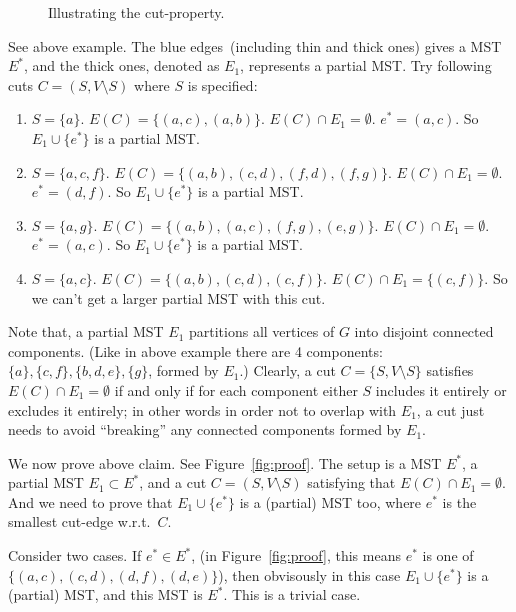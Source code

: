 \begin{figure}[h]
\centering{}
\caption{Illustrating the cut-property.}
\label{fig:spanning}
\end{figure}

See above example. The blue edges~(including thin and thick ones)
gives a MST $E^*$, and the thick ones, denoted as $E_1$, represents a partial MST.
Try following cuts $C = (S, V\setminus S)$ where $S$ is specified:
\begin{enumerate}
\item $S = \{a\}$. $E(C) = \{(a,c), (a,b)\}$. $E(C) \cap E_1 = \emptyset$. $e^* = (a,c)$.
So $E_1\cup\{e^*\}$ is a partial MST.
\item $S = \{a,c,f\}$. $E(C) = \{(a,b), (c,d), (f,d), (f,g)\}$. $E(C) \cap E_1 = \emptyset$. $e^* = (d,f)$.
So $E_1\cup\{e^*\}$ is a partial MST.
\item $S = \{a,g\}$. $E(C) = \{(a,b), (a,c), (f,g), (e,g)\}$. $E(C) \cap E_1 = \emptyset$. $e^* = (a,c)$.
So $E_1\cup\{e^*\}$ is a partial MST.
\item $S = \{a,c\}$. $E(C) = \{(a,b), (c,d), (c,f)\}$. $E(C) \cap E_1 = \{(c,f)\}$. So we can't get a larger partial MST with this cut.
\end{enumerate}

Note that, a partial MST $E_1$ partitions all vertices of $G$ into disjoint connected components.
(Like in above example there are 4 components: $\{a\}, \{c,f\}, \{b,d,e\}, \{g\}$, formed by $E_1$.)
Clearly, a cut $C=\{S,V\setminus S\}$ satisfies $E(C) \cap E_1 = \emptyset$ if and only if for each component
either $S$ includes it entirely or excludes it entirely;
in other words in order not to overlap with $E_1$, a cut just needs to avoid ``breaking''
any connected components formed by $E_1$.

We now prove above claim.  See Figure~\ref{fig:proof}.
The setup is a MST $E^*$, a partial MST $E_1\subset E^*$,
and a cut $C = (S,V\setminus S)$ satisfying that $E(C)\cap E_1 = \emptyset$.
And we need to prove that $E_1\cup \{e^*\}$ is a (partial) MST too,
where $e^*$ is the smallest cut-edge w.r.t.\ $C$.

Consider two cases. If $e^* \in E^*$,
(in Figure~\ref{fig:proof}, this means $e^*$ is one of $\{(a,c),(c,d),(d,f),(d,e)\}$),
then obvisously in this case $E_1\cup \{e^*\}$ is a (partial) MST, and this MST is $E^*$.
This is a trivial case.


